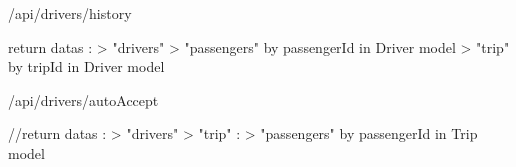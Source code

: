 /api/drivers/history

return datas : {
	> "drivers"
	> "passengers" by passengerId in Driver model
	> "trip" by tripId in Driver model
}

/api/drivers/autoAccept

//return datas : {
	> "drivers"
	> "trip" : {
		> "passengers" by passengerId in Trip model
}
}